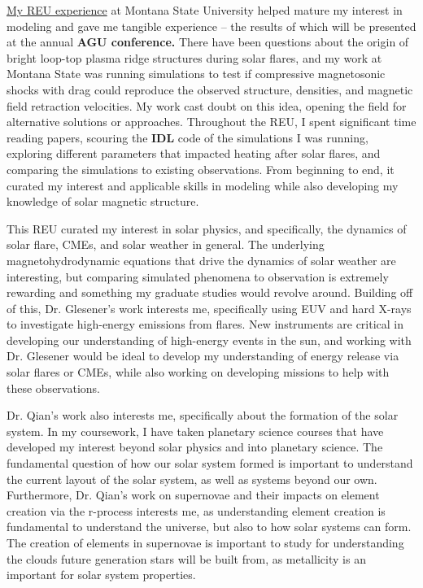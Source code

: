\documentclass[11pt,letterpaper]{article}
\begin{document}
\href{http://solar.physics.montana.edu/www/reu/2021/mccreery/}{My REU experience} at Montana State University helped mature my interest in modeling and gave me tangible experience – the results of which will be presented at the annual \textbf{AGU conference.} There have been questions about the origin of bright loop-top plasma ridge structures during solar flares, and my work at Montana State was running simulations to test if compressive magnetosonic shocks with drag could reproduce the observed structure, densities, and magnetic field retraction velocities. My work cast doubt on this idea, opening the field for alternative solutions or approaches. Throughout the REU, I spent significant time reading papers, scouring the \textbf{IDL} code of the simulations I was running, exploring different parameters that impacted heating after solar flares, and comparing the simulations to existing observations. From beginning to end, it curated my interest and applicable skills in modeling while also developing my knowledge of solar magnetic structure. 

This REU curated my interest in solar physics, and specifically, the dynamics of solar flare, CMEs, and solar weather in general. The underlying magnetohydrodynamic equations that drive the dynamics of solar weather are interesting, but comparing simulated phenomena to observation is extremely rewarding and something my graduate studies would revolve around. Building off of this, Dr. Glesener's work interests me, specifically using EUV and hard X-rays to investigate high-energy emissions from flares. New instruments are critical in developing our understanding of high-energy events in the sun, and working with Dr. Glesener would be ideal to develop my understanding of energy release via solar flares or CMEs, while also working on developing missions to help with these observations.

\pagebreak

Dr. Qian's work also interests me, specifically about the formation of the solar system. In my coursework, I have taken planetary science courses that have developed my interest beyond solar physics and into planetary science. The fundamental question of how our solar system formed is important to understand the current layout of the solar system, as well as systems beyond our own. Furthermore, Dr. Qian's work on supernovae and their impacts on element creation via the r-process interests me, as understanding element creation is fundamental to understand the universe, but also to how solar systems can form. The creation of elements in supernovae is important to study for understanding the clouds future generation stars will be built from, as metallicity is an important for solar system properties.
\end{document}
